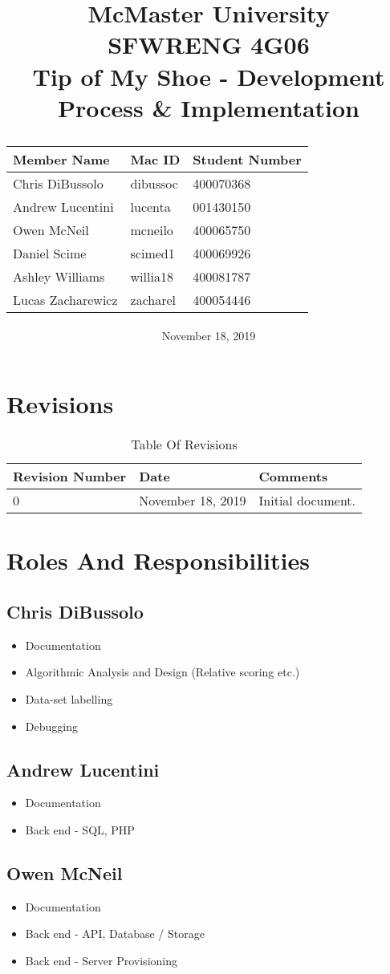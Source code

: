 \documentclass[12pt, titlepage]{article}
\title{
McMaster University\\
SFWRENG 4G06\\
\bigskip\bigskip\bigskip
{\bf Tip of My Shoe - Development Process \& Implementation\\}
\bigskip\bigskip\bigskip\bigskip
\begin{table}[h!]
\begin{center}
\begin{tabular}{|p{5cm}|p{5cm}|p{5cm}|}
	\hline
	\bf Member Name & \bf Mac ID & \bf Student Number\\
	\hline
	\hline
	Chris DiBussolo & dibussoc & 400070368\\
	\hline
    Andrew Lucentini & lucenta & 001430150\\
    \hline
	Owen McNeil & mcneilo & 400065750 \\
	\hline
	Daniel Scime & scimed1 & 400069926\\
	\hline
    Ashley Williams & willia18 & 400081787\\
	\hline
    Lucas Zacharewicz & zacharel & 400054446\\
	\hline
\end{tabular}
\end{center}
\end{table}
\date{November 18, 2019}
}
\begin{document}
\maketitle
\tableofcontents
\newpage
\listoffigures
\listoftables

\newpage
\section{Revisions}
\begin{table}[!htbp]
\begin{center}
\begin{tabular}{|p{5cm}|p{5cm}|p{5cm}|}
	\hline
	\bf Revision Number & \bf Date & \bf Comments\\
	\hline
	\hline
    0 & November 18, 2019 & Initial document.\\
	\hline
\end{tabular}
\caption{Table Of Revisions}
\end{center}
\end{table}

\section{Roles And Responsibilities}
\subsection{Chris DiBussolo}
\begin{itemize}
    \item Documentation
    \item Algorithmic Analysis and Design (Relative scoring etc.)
    \item Data-set labelling
    \item Debugging
\end{itemize}
\subsection{Andrew Lucentini}
\begin{itemize}
    \item Documentation
    \item Back end - SQL, PHP
\end{itemize}
\subsection{Owen McNeil}
\begin{itemize}
    \item Documentation
    \item Back end - API, Database / Storage
    \item Back end - Server Provisioning 
\end{itemize}
\end{document}
